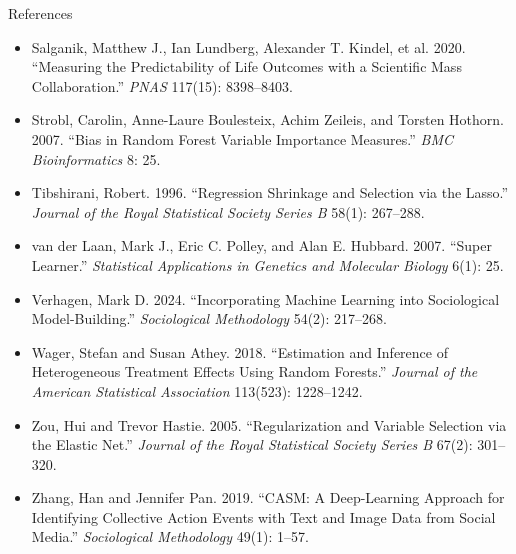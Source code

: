 \documentclass[aspectratio=169,11pt,xcolor=dvipsnames]{beamer}
\begin{document}
\begin{frame}[allowframebreaks,t]{References}
\begin{itemize}
\item Salganik, Matthew J., Ian Lundberg, Alexander T. Kindel, et al. 2020. ``Measuring the Predictability of Life Outcomes with a Scientific Mass Collaboration.'' \textit{PNAS} 117(15): 8398--8403.
\item Strobl, Carolin, Anne-Laure Boulesteix, Achim Zeileis, and Torsten Hothorn. 2007. ``Bias in Random Forest Variable Importance Measures.'' \textit{BMC Bioinformatics} 8: 25.
\item Tibshirani, Robert. 1996. ``Regression Shrinkage and Selection via the Lasso.'' \textit{Journal of the Royal Statistical Society Series B} 58(1): 267--288.
\item van der Laan, Mark J., Eric C. Polley, and Alan E. Hubbard. 2007. ``Super Learner.'' \textit{Statistical Applications in Genetics and Molecular Biology} 6(1): 25.
\item Verhagen, Mark D. 2024. ``Incorporating Machine Learning into Sociological Model-Building.'' \textit{Sociological Methodology} 54(2): 217--268.
\item Wager, Stefan and Susan Athey. 2018. ``Estimation and Inference of Heterogeneous Treatment Effects Using Random Forests.'' \textit{Journal of the American Statistical Association} 113(523): 1228--1242.
\item Zou, Hui and Trevor Hastie. 2005. ``Regularization and Variable Selection via the Elastic Net.'' \textit{Journal of the Royal Statistical Society Series B} 67(2): 301--320.
\item Zhang, Han and Jennifer Pan. 2019. ``CASM: A Deep-Learning Approach for Identifying Collective Action Events with Text and Image Data from Social Media.'' \textit{Sociological Methodology} 49(1): 1--57.
\end{itemize}
\end{frame}
\end{document}
